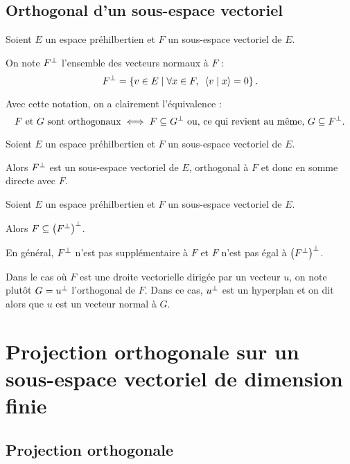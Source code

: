 \subsection{Orthogonal d'un sous-espace vectoriel}

\begin{defi}
Soient \(E\) un espace préhilbertien et \(F\) un sous-espace vectoriel de \(E\).

On note \(F^{\perp}\) l'ensemble des vecteurs normaux à \(F\) : \[F\ortho=\accol{v\in E\tq\quantifs{\forall x\in F}\ps{v}{x}=0}.\]
\end{defi}

Avec cette notation, on a clairement l'équivalence : \[F\text{ et }G\text{ sont orthogonaux}\iff F\subseteq G^{\perp}\text{ ou, ce qui revient au même, }G\subseteq F^{\perp}.\]

\begin{theo}
Soient \(E\) un espace préhilbertien et \(F\) un sous-espace vectoriel de \(E\).

Alors \(F^{\perp}\) est un sous-espace vectoriel de \(E\), orthogonal à \(F\) et donc en somme directe avec \(F\).
\end{theo}

\begin{prop}
Soient \(E\) un espace préhilbertien et \(F\) un sous-espace vectoriel de \(E\).

Alors \(F\subseteq\left(F^{\perp}\right)^{\perp}\).
\end{prop}

\begin{rem}
En général, \(F^{\perp}\) n'est pas supplémentaire à \(F\) et \(F\) n'est pas égal à \(\left(F^{\perp}\right)^{\perp}\).
\end{rem}

\begin{rem}
Dans le cas où \(F\) est une droite vectorielle dirigée par un vecteur \(u\), on note plutôt \(G=u^{\perp}\) l'orthogonal de \(F\). Dans ce cas, \(u^{\perp}\) est un hyperplan et on dit alors que \(u\) est un vecteur normal à \(G\).
\end{rem}

\section{Projection orthogonale sur un sous-espace vectoriel de dimension finie}

\subsection{Projection orthogonale}

